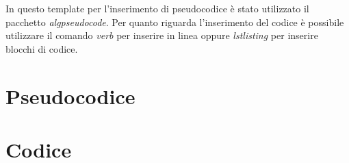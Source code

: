 In questo template per l'inserimento di pseudocodice è stato utilizzato il pacchetto \textit{algpseudocode}. Per quanto riguarda l'inserimento del codice è possibile utilizzare il comando \textit{verb} per inserire in linea oppure \textit{lstlisting} per inserire blocchi di codice.

\section{Pseudocodice}


\section{Codice}

